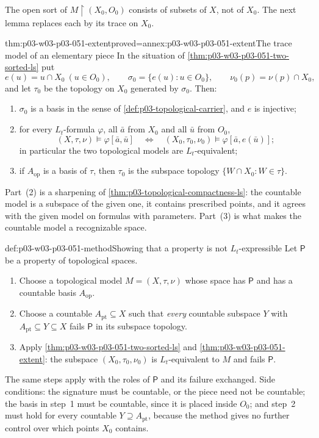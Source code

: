 The open sort of \(M\restriction(X_0,O_0)\) consists of subsets of \(X\),
not of \(X_0\). The next lemma replaces each by its trace on \(X_0\).

\begin{hblemma}{thm:p03-w03-p03-051-extent}{proved=annex:p03-w03-p03-051-extent}{The trace model of an elementary piece}
In the situation of \cref{thm:p03-w03-p03-051-two-sorted-ls} put
\[
 e(u)=u\cap X_0\ (u\in O_0),\qquad
 \sigma_0=\{e(u):u\in O_0\},\qquad
 \nu_0(p)=\nu(p)\cap X_0,
\]
and let \(\tau_0\) be the topology on \(X_0\) generated by \(\sigma_0\).
Then:
\begin{enumerate}
\item \(\sigma_0\) is a basis in the sense of
      \cref{def:p03-topological-carrier}, and \(e\) is injective;
\item for every \(L_t\)-formula \(\varphi\), all \(\bar a\) from \(X_0\)
      and all \(\bar u\) from \(O_0\),
      \[
       (X,\tau,\nu)\models\varphi[\bar a,\bar u]
       \quad\Longleftrightarrow\quad
       (X_0,\tau_0,\nu_0)\models\varphi[\bar a,e(\bar u)];
      \]
      in particular the two topological models are \(L_t\)-equivalent;
\item if \(A_{\mathrm{op}}\) is a basis of \(\tau\), then \(\tau_0\) is the
      subspace topology \(\{W\cap X_0:W\in\tau\}\).
\end{enumerate}
\end{hblemma}

Part~(2) is a sharpening of \cref{thm:p03-topological-compactness-ls}: the
countable model is a subspace of the given one, it contains prescribed
points, and it agrees with the given model on formulas with parameters.
Part~(3) is what makes the countable model a recognizable space.

\begin{hbmethod}{def:p03-w03-p03-051-method}{Showing that a property is not \(L_t\)-expressible}
Let \(\mathsf P\) be a property of topological spaces.
\begin{enumerate}
\item Choose a topological model \(M=(X,\tau,\nu)\) whose space has
      \(\mathsf P\) and has a countable basis \(A_{\mathrm{op}}\).
\item Choose a countable \(A_{\mathrm{pt}}\subseteq X\) such that
      \emph{every} countable subspace \(Y\) with
      \(A_{\mathrm{pt}}\subseteq Y\subseteq X\) fails \(\mathsf P\) in its
      subspace topology.
\item Apply \cref{thm:p03-w03-p03-051-two-sorted-ls} and
      \cref{thm:p03-w03-p03-051-extent}: the subspace
      \((X_0,\tau_0,\nu_0)\) is \(L_t\)-equivalent to \(M\) and fails
      \(\mathsf P\).
\end{enumerate}
The same steps apply with the roles of \(\mathsf P\) and its failure
exchanged. Side conditions: the signature must be countable, or the piece
need not be countable; the basis in step~1 must be countable, since it is
placed inside \(O_0\); and step~2 must hold for every countable
\(Y\supseteq A_{\mathrm{pt}}\), because the method gives no further
control over which points \(X_0\) contains.
\end{hbmethod}

